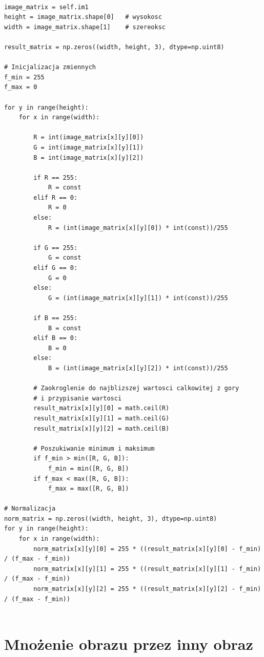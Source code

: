 \documentclass[final,a4paper,openany,12pt]{mwbk}
\begin{document}
\begin{lstlisting}[caption=Mnożenie obrazu barwowego przez zadaną liczbę]

image_matrix = self.im1
height = image_matrix.shape[0]   # wysokosc
width = image_matrix.shape[1]    # szereoksc

result_matrix = np.zeros((width, height, 3), dtype=np.uint8)

# Inicjalizacja zmiennych
f_min = 255
f_max = 0

for y in range(height):
    for x in range(width):  

        R = int(image_matrix[x][y][0])
        G = int(image_matrix[x][y][1])
        B = int(image_matrix[x][y][2])

        if R == 255:
            R = const
        elif R == 0:
            R = 0
        else:
            R = (int(image_matrix[x][y][0]) * int(const))/255 
        
        if G == 255:
            G = const
        elif G == 0:
            G = 0
        else:
            G = (int(image_matrix[x][y][1]) * int(const))/255 
        
        if B == 255:
            B = const
        elif B == 0:
            B = 0
        else:
            B = (int(image_matrix[x][y][2]) * int(const))/255 

        # Zaokroglenie do najblizszej wartosci calkowitej z gory
        # i przypisanie wartosci
        result_matrix[x][y][0] = math.ceil(R)
        result_matrix[x][y][1] = math.ceil(G)
        result_matrix[x][y][2] = math.ceil(B)

        # Poszukiwanie minimum i maksimum                
        if f_min > min([R, G, B]):
            f_min = min([R, G, B])
        if f_max < max([R, G, B]):
            f_max = max([R, G, B])

# Normalizacja
norm_matrix = np.zeros((width, height, 3), dtype=np.uint8)
for y in range(height):
    for x in range(width):
        norm_matrix[x][y][0] = 255 * ((result_matrix[x][y][0] - f_min) / (f_max - f_min))
        norm_matrix[x][y][1] = 255 * ((result_matrix[x][y][1] - f_min) / (f_max - f_min))
        norm_matrix[x][y][2] = 255 * ((result_matrix[x][y][2] - f_min) / (f_max - f_min))


\end{lstlisting}

\section {Mnożenie obrazu przez inny obraz}
\hfill
\\\\
\indent
\end{document}
